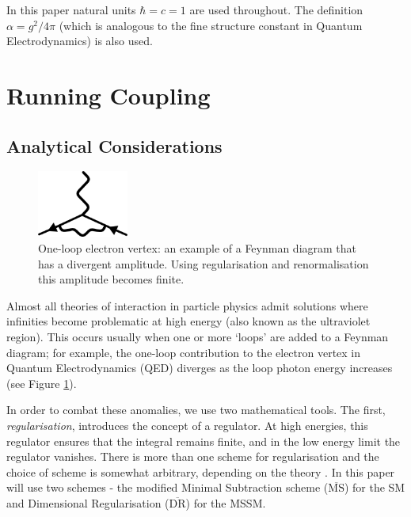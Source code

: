 \documentclass[12pt,a4paper,oneside]{article}
\begin{document}
In this paper natural units $\hbar = c = 1$ are used throughout. The definition $\alpha = g^2 / 4 \pi$ (which is analogous to the fine structure constant in Quantum Electrodynamics) is also used.

\section{Running Coupling}
\label{sec:rc}

\subsection{Analytical Considerations}

\begin{figure}[!ht]
\begin{center}
\includegraphics[width=3cm]{figs/vertex-1loop.png}
\caption[]{One-loop electron vertex: an example of a Feynman diagram that has a divergent amplitude. Using regularisation and renormalisation this amplitude becomes finite.}
\label{fig:vertex}
\end{center}
\end{figure}

Almost all theories of interaction in particle physics admit solutions where infinities become problematic at high energy (also known as the ultraviolet region). This occurs usually when one or more `loops' are added to a Feynman diagram; for example, the one-loop contribution to the electron vertex in Quantum Electrodynamics (QED) diverges as the loop photon energy increases (see Figure \ref{fig:vertex}). 

In order to combat these anomalies, we use two mathematical tools. The first, \textit{regularisation}, introduces the concept of a regulator. At high energies, this regulator ensures that the integral remains finite, and in the low energy limit the regulator vanishes. There is more than one scheme for regularisation and the choice of scheme is somewhat arbitrary, depending on the theory \cite{peskin}. In this paper will use two schemes - the modified Minimal Subtraction scheme ($\overline{\mathrm{MS}}$) \cite{ms} for the SM and Dimensional Regularisation ($\overline{\mathrm{DR}}$) \cite{dr} for the MSSM.
\end{document}
